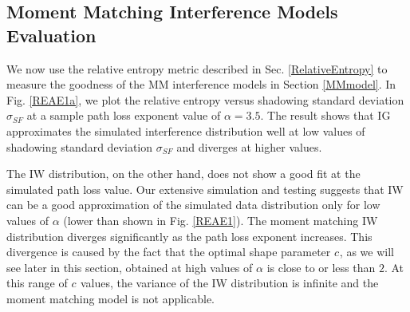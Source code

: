 \documentclass[12pt, draftclsnofoot, onecolumn]{IEEEtran}
\theoremstyle{plain}
\begin{document}
\subsection{Moment Matching Interference Models Evaluation}\vspace{-.1in}
We now use the relative entropy metric described in Sec. \ref{RelativeEntropy} to measure the goodness of the MM interference models in Section \ref{MMmodel}. In Fig. \ref{REAE1a}, we plot the relative entropy versus shadowing standard deviation $\sigma_{SF}$ at a sample path loss exponent value of $\alpha=3.5$. The result shows that IG approximates the simulated interference distribution well at low values of shadowing standard deviation $\sigma_{SF}$ and diverges at higher values. 

The IW distribution, on the other hand, does not show a good fit at the simulated path loss value. Our extensive simulation and testing suggests that IW can be a good approximation of the simulated data distribution only for low values of $\alpha$ (lower than shown in Fig. \ref{REAE1}). 
The moment matching IW distribution diverges significantly as the path loss exponent increases. This divergence is caused by the fact that the optimal shape parameter ${{c_{}}}$, as we will see later in this section, obtained at high values of $\alpha$ is close to or less than $2$. At this range of ${{c_{}}}$ values, the variance of the IW distribution is infinite and the moment matching model is not applicable.
\end{document}
